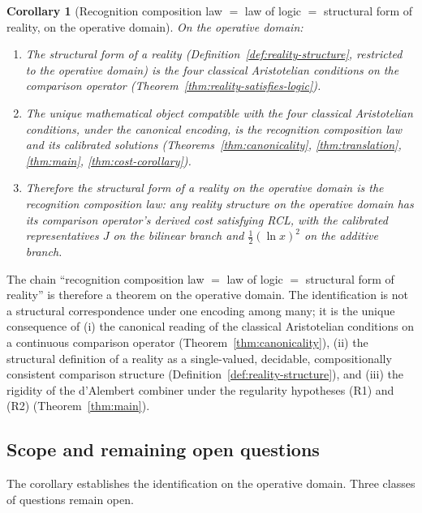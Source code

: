 \documentclass[11pt,a4paper]{article}
\newtheorem{corollary}[theorem]{Corollary}
\theoremstyle{definition}
\theoremstyle{remark}
\begin{document}
\begin{corollary}[Recognition composition law $=$ law of logic $=$ structural form of reality, on the operative domain]
\label{cor:rcl-logic-reality}
On the operative domain:
\begin{enumerate}[label=(\arabic*),leftmargin=*]
\item The structural form of a reality
(Definition~\ref{def:reality-structure}, restricted to the operative
domain) is the four classical Aristotelian conditions on the
comparison operator (Theorem~\ref{thm:reality-satisfies-logic}).
\item The unique mathematical object compatible with the four
classical Aristotelian conditions, under the canonical encoding, is
the recognition composition law and its calibrated solutions
(Theorems~\ref{thm:canonicality}, \ref{thm:translation},
\ref{thm:main}, \ref{thm:cost-corollary}).
\item Therefore the structural form of a reality on the operative
domain is the recognition composition law: any reality structure on
the operative domain has its comparison operator's derived cost
satisfying RCL, with the calibrated representatives $J$ on the
bilinear branch and $\tfrac{1}{2}(\ln x)^2$ on the additive branch.
\end{enumerate}
\end{corollary}

The chain ``recognition composition law $=$ law of logic $=$
structural form of reality'' is therefore a theorem on the operative
domain. The identification is not a structural correspondence under
one encoding among many; it is the unique consequence of (i) the
canonical reading of the classical Aristotelian conditions on a
continuous comparison operator (Theorem~\ref{thm:canonicality}),
(ii) the structural definition of a reality as a single-valued,
decidable, compositionally consistent comparison structure
(Definition~\ref{def:reality-structure}), and (iii) the rigidity of
the d'Alembert combiner under the regularity hypotheses (R1) and (R2)
(Theorem~\ref{thm:main}).

\subsection{Scope and remaining open questions}

The corollary establishes the identification on the operative domain.
Three classes of questions remain open.
\end{document}
